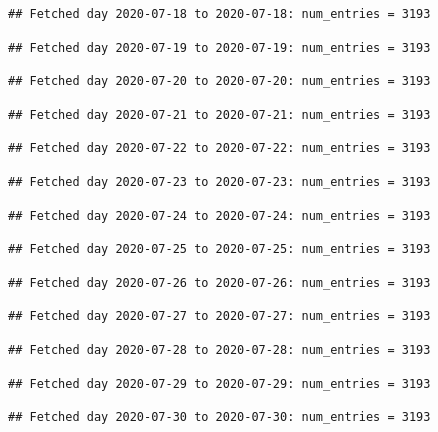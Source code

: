 \documentclass[]{article}
\begin{document}
\begin{verbatim}
## Fetched day 2020-07-18 to 2020-07-18: num_entries = 3193
\end{verbatim}

\begin{verbatim}
## Fetched day 2020-07-19 to 2020-07-19: num_entries = 3193
\end{verbatim}

\begin{verbatim}
## Fetched day 2020-07-20 to 2020-07-20: num_entries = 3193
\end{verbatim}

\begin{verbatim}
## Fetched day 2020-07-21 to 2020-07-21: num_entries = 3193
\end{verbatim}

\begin{verbatim}
## Fetched day 2020-07-22 to 2020-07-22: num_entries = 3193
\end{verbatim}

\begin{verbatim}
## Fetched day 2020-07-23 to 2020-07-23: num_entries = 3193
\end{verbatim}

\begin{verbatim}
## Fetched day 2020-07-24 to 2020-07-24: num_entries = 3193
\end{verbatim}

\begin{verbatim}
## Fetched day 2020-07-25 to 2020-07-25: num_entries = 3193
\end{verbatim}

\begin{verbatim}
## Fetched day 2020-07-26 to 2020-07-26: num_entries = 3193
\end{verbatim}

\begin{verbatim}
## Fetched day 2020-07-27 to 2020-07-27: num_entries = 3193
\end{verbatim}

\begin{verbatim}
## Fetched day 2020-07-28 to 2020-07-28: num_entries = 3193
\end{verbatim}

\begin{verbatim}
## Fetched day 2020-07-29 to 2020-07-29: num_entries = 3193
\end{verbatim}

\begin{verbatim}
## Fetched day 2020-07-30 to 2020-07-30: num_entries = 3193
\end{verbatim}
\end{document}
